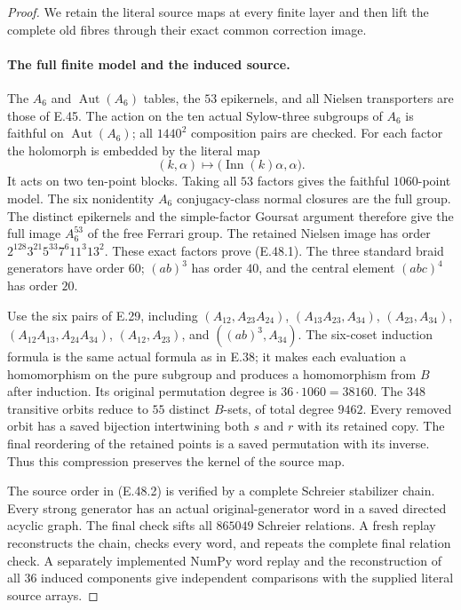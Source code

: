 \begin{proof}
We retain the literal source maps at every finite layer and then lift the
complete old fibres through their exact common correction image.
\paragraph{The full finite model and the induced source.}
The $A_6$ and $\operatorname{Aut}(A_6)$ tables, the $53$ epikernels,
and all Nielsen transporters are those of E.45.
The action on the ten actual Sylow-three subgroups of $A_6$ is
faithful on $\operatorname{Aut}(A_6)$; all $1440^2$ composition
pairs are checked.
For each factor the holomorph is embedded by the literal map
\[
 (k,\alpha)\longmapsto
       \bigl(\operatorname{Inn}(k)\alpha,\alpha\bigr).
 \tag{E.48.6}
\]
It acts on two ten-point blocks.  Taking all $53$ factors gives
the faithful $1060$-point model.
The six nonidentity $A_6$ conjugacy-class normal closures are
the full group.  The distinct epikernels and the simple-factor
Goursat argument therefore give the full image $A_6^{53}$ of
the free Ferrari group.
The retained Nielsen image has order
$2^{128}3^{21}5^{33}7^6 11^3 13^2$.
These exact factors prove \textup{(E.48.1)}.
The three standard braid generators have order $60$;
$(ab)^3$ has order $40$, and the central element $(abc)^4$
has order $20$.

Use the six pairs of E.29, including
$(A_{12},A_{23}A_{24})$, $(A_{13}A_{23},A_{34})$,
$(A_{23},A_{34})$, $(A_{12}A_{13},A_{24}A_{34})$,
$(A_{12},A_{23})$, and $((ab)^3,A_{34})$.
The six-coset induction formula is the same actual formula as
in E.38; it makes each evaluation a homomorphism on the pure
subgroup and produces a homomorphism from $B$ after induction.
Its original permutation degree is $36\cdot1060=38160$.
The $348$ transitive orbits reduce to $55$ distinct $B$-sets,
of total degree $9462$.
Every removed orbit has a saved bijection intertwining both
$s$ and $r$ with its retained copy.
The final reordering of the retained points is a saved
permutation with its inverse.
Thus this compression preserves the kernel of the source map.

The source order in \textup{(E.48.2)} is verified by a complete
Schreier stabilizer chain.  Every strong generator has an actual
original-generator word in a saved directed acyclic graph.
The final check sifts all $865049$ Schreier relations.
A fresh replay reconstructs the chain, checks every word, and
repeats the complete final relation check.
A separately implemented NumPy word replay and the reconstruction
of all $36$ induced components give independent comparisons with
the supplied literal source arrays.


\end{proof}
